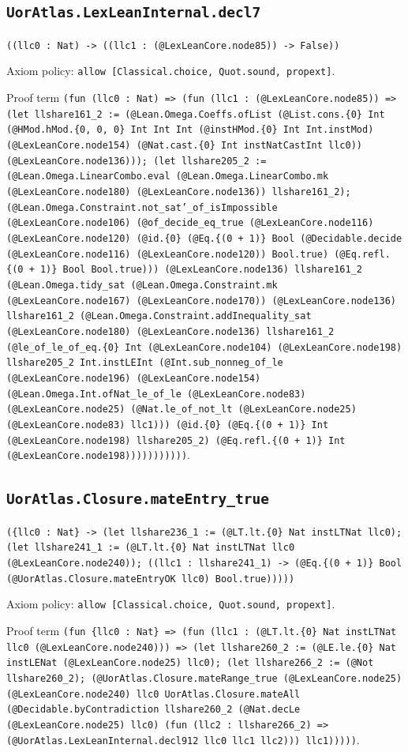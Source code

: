 \documentclass[11pt]{article}
\begin{document}
\subsection*{\texttt{UorAtlas.LexLeanInternal.decl7}}
\noindent\texttt{((llc0 : Nat) -> ((llc1 : (@LexLeanCore.node85)) -> False))}\par
\noindent Axiom policy: \texttt{allow [Classical.choice, Quot.sound, propext]}.\par
\noindent Proof term \texttt{(fun (llc0 : Nat) => (fun (llc1 : (@LexLeanCore.node85)) => (let llshare161\_2 := (@Lean.Omega.Coeffs.ofList (@List.cons.\{0\} Int (@HMod.hMod.\{0, 0, 0\} Int Int Int (@instHMod.\{0\} Int Int.instMod) (@LexLeanCore.node154) (@Nat.cast.\{0\} Int instNatCastInt llc0)) (@LexLeanCore.node136))); (let llshare205\_2 := (@Lean.Omega.LinearCombo.eval (@Lean.Omega.LinearCombo.mk (@LexLeanCore.node180) (@LexLeanCore.node136)) llshare161\_2); (@Lean.Omega.Constraint.not\_sat'\_of\_isImpossible (@LexLeanCore.node106) (@of\_decide\_eq\_true (@LexLeanCore.node116) (@LexLeanCore.node120) (@id.\{0\} (@Eq.\{(0 + 1)\} Bool (@Decidable.decide (@LexLeanCore.node116) (@LexLeanCore.node120)) Bool.true) (@Eq.refl.\{(0 + 1)\} Bool Bool.true))) (@LexLeanCore.node136) llshare161\_2 (@Lean.Omega.tidy\_sat (@Lean.Omega.Constraint.mk (@LexLeanCore.node167) (@LexLeanCore.node170)) (@LexLeanCore.node136) llshare161\_2 (@Lean.Omega.Constraint.addInequality\_sat (@LexLeanCore.node180) (@LexLeanCore.node136) llshare161\_2 (@le\_of\_le\_of\_eq.\{0\} Int (@LexLeanCore.node104) (@LexLeanCore.node198) llshare205\_2 Int.instLEInt (@Int.sub\_nonneg\_of\_le (@LexLeanCore.node196) (@LexLeanCore.node154) (@Lean.Omega.Int.ofNat\_le\_of\_le (@LexLeanCore.node83) (@LexLeanCore.node25) (@Nat.le\_of\_not\_lt (@LexLeanCore.node25) (@LexLeanCore.node83) llc1))) (@id.\{0\} (@Eq.\{(0 + 1)\} Int (@LexLeanCore.node198) llshare205\_2) (@Eq.refl.\{(0 + 1)\} Int (@LexLeanCore.node198)))))))))))}.\par
\subsection*{\texttt{UorAtlas.Closure.mateEntry\_true}}
\noindent\texttt{(\{llc0 : Nat\} -> (let llshare236\_1 := (@LT.lt.\{0\} Nat instLTNat llc0); (let llshare241\_1 := (@LT.lt.\{0\} Nat instLTNat llc0 (@LexLeanCore.node240)); ((llc1 : llshare241\_1) -> (@Eq.\{(0 + 1)\} Bool (@UorAtlas.Closure.mateEntryOK llc0) Bool.true)))))}\par
\noindent Axiom policy: \texttt{allow [Classical.choice, Quot.sound, propext]}.\par
\noindent Proof term \texttt{(fun \{llc0 : Nat\} => (fun (llc1 : (@LT.lt.\{0\} Nat instLTNat llc0 (@LexLeanCore.node240))) => (let llshare260\_2 := (@LE.le.\{0\} Nat instLENat (@LexLeanCore.node25) llc0); (let llshare266\_2 := (@Not llshare260\_2); (@UorAtlas.Closure.mateRange\_true (@LexLeanCore.node25) (@LexLeanCore.node240) llc0 UorAtlas.Closure.mateAll (@Decidable.byContradiction llshare260\_2 (@Nat.decLe (@LexLeanCore.node25) llc0) (fun (llc2 : llshare266\_2) => (@UorAtlas.LexLeanInternal.decl912 llc0 llc1 llc2))) llc1)))))}.\par
\end{document}
